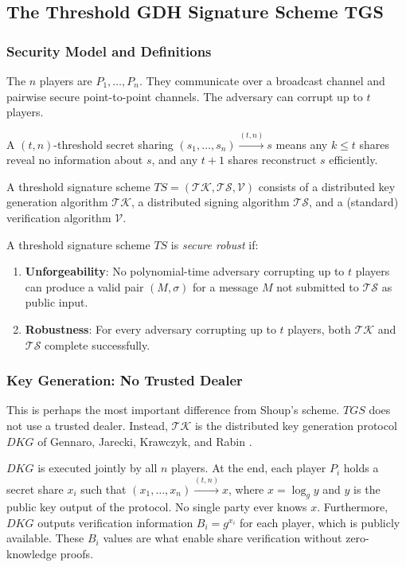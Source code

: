 \subsection{The Threshold GDH Signature Scheme TGS}

\subsubsection{Security Model and Definitions}

The $n$ players are $P_1, \ldots, P_n$. They communicate over a broadcast channel and
pairwise secure point-to-point channels. The adversary can corrupt up to $t$ players.

A $(t, n)$-threshold secret sharing $(s_1, \ldots, s_n) \xrightarrow{(t,n)} s$ means
any $k \leq t$ shares reveal no information about $s$, and any $t+1$ shares reconstruct
$s$ efficiently.

A threshold signature scheme $TS = (\mathcal{TK}, \mathcal{TS}, \mathcal{V})$ consists
of a distributed key generation algorithm $\mathcal{TK}$, a distributed signing algorithm
$\mathcal{TS}$, and a (standard) verification algorithm $\mathcal{V}$.

\begin{definition}
A threshold signature scheme $TS$ is \emph{secure robust} if:
\begin{enumerate}
    \item \textbf{Unforgeability}: No polynomial-time adversary corrupting up to $t$
    players can produce a valid pair $(M, \sigma)$ for a message $M$ not submitted to
    $\mathcal{TS}$ as public input.
    \item \textbf{Robustness}: For every adversary corrupting up to $t$ players, both
    $\mathcal{TK}$ and $\mathcal{TS}$ complete successfully.
\end{enumerate}
\end{definition}

\subsubsection{Key Generation: No Trusted Dealer}

This is perhaps the most important difference from Shoup's scheme. $TGS$ does not use a
trusted dealer. Instead, $\mathcal{TK}$ is the distributed key generation protocol
$DKG$ of Gennaro, Jarecki, Krawczyk, and Rabin \cite{GJKR99}.

$DKG$ is executed jointly by all $n$ players. At the end, each player $P_i$ holds a
secret share $x_i$ such that $(x_1, \ldots, x_n) \xrightarrow{(t,n)} x$, where $x =
\log_g y$ and $y$ is the public key output of the protocol. No single party ever knows
$x$. Furthermore, $DKG$ outputs verification information $B_i = g^{x_i}$ for each
player, which is publicly available. These $B_i$ values are what enable share
verification without zero-knowledge proofs.

